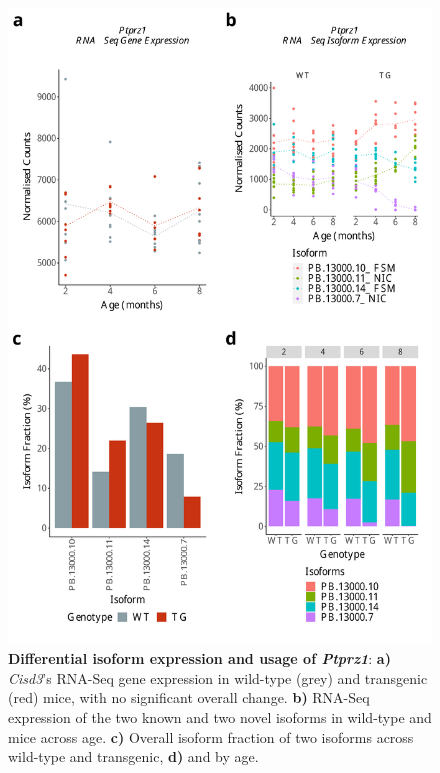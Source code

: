 

\begin{figure}[htp]
	\begin{center}
		\includegraphics[page=1,scale = 0.55]{Figures/DIU_notDEG_nomajor.pdf}
	\end{center}
	\captionsetup{width=0.95\textwidth}
	\caption[Differential isoform expression and usage of \textit{Ptprz1}]%
	{\textbf{Differential isoform expression and usage of \textit{Ptprz1}}: \textbf{a)} \textit{Cisd3}'s RNA-Seq gene expression in wild-type (grey) and transgenic (red) mice, with no significant overall change. \textbf{b)} RNA-Seq expression of the two known and two novel isoforms in wild-type and mice across age. \textbf{c)} Overall isoform fraction of two isoforms across wild-type and transgenic, \textbf{d)} and by age.}    
	\label{fig:DIU_ptprz1}
\end{figure}


